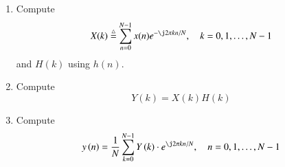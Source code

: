 \documentclass[journal,12pt,twocolumn]{IEEEtran}
\newcommand{\define}{\stackrel{\triangle}{=}}
\theoremstyle{remark}
\begin{document}
\begin{enumerate}[label=\thesection.\arabic*]
\item
Compute
\begin{equation}
X(k) \define \sum _{n=0}^{N-1}x(n) e^{-\j2\pi kn/N}, \quad k = 0,1,\dots, N-1
\end{equation}
and $H(k)$ using $h(n)$.
\item Compute 
\begin{equation}
Y(k) = X(k)H(k)
\label{eq:fp}
\end{equation}
\item Compute
\begin{equation}
y\brak{n}={\frac {1}{N}}\sum _{k=0}^{N-1}Y\brak{k}\cdot e^{\j 2\pi kn/N},\quad n = 0,1,\dots, N-1
\label{eq:inv-ft}
\end{equation}


\end{enumerate}
\end{document}
